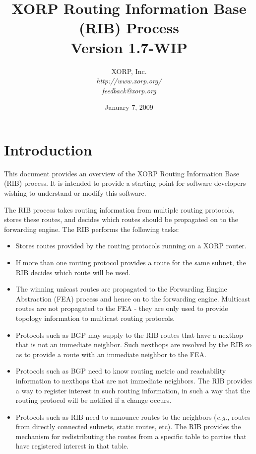 \documentclass[11pt]{article}
\newcommand{\eg}{\emph{e.g.,}\xspace}
\begin{document}
\title{XORP Routing Information Base (RIB) Process \\
\vspace{1ex}
Version 1.7-WIP}
\author{ XORP, Inc.					\\
         {\it http://www.xorp.org/}			\\
	 {\it feedback@xorp.org}
}
\date{January 7, 2009}

\maketitle


\section{Introduction}

This document provides an overview of the XORP Routing Information
Base (RIB) process.  It is intended to provide a starting point for
software developers wishing to understand or modify this software.

The RIB process takes routing information from multiple routing
protocols, stores these routes, and decides which routes should be
propagated on to the forwarding engine.  The RIB performs the following
tasks:

\begin{itemize}

  \item Stores routes provided by the routing protocols running on a XORP
  router.

  \item If more than one routing protocol provides a route for the same
  subnet, the RIB decides which route will be used.

  \item The winning unicast routes are propagated to the Forwarding
  Engine Abstraction (FEA) process and hence on to the forwarding
  engine. Multicast routes are not propagated to the FEA - they are only
  used to provide topology information to multicast routing protocols.

  \item Protocols such as BGP may supply to the RIB routes that have a
  nexthop that is not an immediate neighbor.  Such nexthops are resolved
  by the RIB so as to provide a route with an immediate neighbor to the
  FEA.

  \item Protocols such as BGP need to know routing metric and
  reachability information to nexthops that are not immediate neighbors.
  The RIB provides a way to register interest in such routing
  information, in such a way that the routing protocol will be notified
  if a change occurs.

  \item Protocols such as RIB need to announce routes to the neighbors
  (\eg routes from directly connected subnets, static routes, etc).
  The RIB provides the mechanism for redistributing the routes from
  a specific table to parties that have registered interest in that
  table.

\end{itemize}
\end{document}
